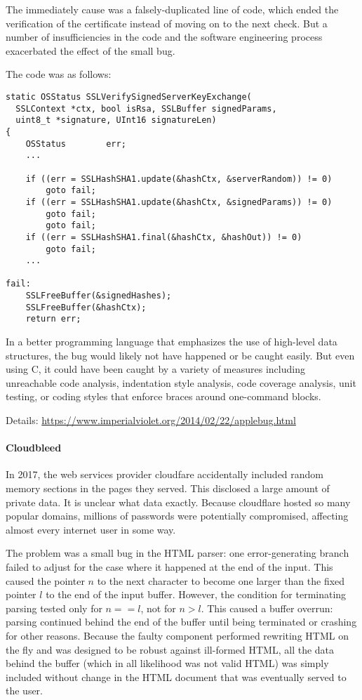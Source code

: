 The immediately cause was a falsely-duplicated line of code, which ended the verification of the certificate instead of moving on to the next check.
But a number of insufficiencies in the code and the software engineering process exacerbated the effect of the small bug.

The code was as follows:

\begin{lstlisting}
static OSStatus SSLVerifySignedServerKeyExchange(
  SSLContext *ctx, bool isRsa, SSLBuffer signedParams,
  uint8_t *signature, UInt16 signatureLen)
{
	OSStatus        err;
	...

	if ((err = SSLHashSHA1.update(&hashCtx, &serverRandom)) != 0)
		goto fail;
	if ((err = SSLHashSHA1.update(&hashCtx, &signedParams)) != 0)
		goto fail;
		goto fail;
	if ((err = SSLHashSHA1.final(&hashCtx, &hashOut)) != 0)
		goto fail;
	...

fail:
	SSLFreeBuffer(&signedHashes);
	SSLFreeBuffer(&hashCtx);
	return err;
\end{lstlisting}

In a better programming language that emphasizes the use of high-level data structures, the bug would likely not have happened or be caught easily.
But even using C, it could have been caught by a variety of measures including unreachable code analysis, indentation style analysis, code coverage analysis, unit testing, or coding styles that enforce braces around one-command blocks.
 
Details: \url{https://www.imperialviolet.org/2014/02/22/applebug.html}

\paragraph{Cloudbleed}
In 2017, the web services provider cloudfare accidentally included random memory sections in the pages they served.
This disclosed a large amount of private data.
It is unclear what data exactly.
Because cloudflare hosted so many popular domains, millions of passwords were potentially compromised, affecting almost every internet user in some way.

The problem was a small bug in the HTML parser: one error-generating branch failed to adjust for the case where it happened at the end of the input.
This caused the pointer $n$ to the next character to become one larger than the fixed pointer $l$ to the end of the input buffer.
However, the condition for terminating parsing tested only for $n==l$, not for $n>l$.
This caused a buffer overrun: parsing continued behind the end of the buffer until being terminated or crashing for other reasons.
Because the faulty component performed rewriting HTML on the fly and was designed to be robust against ill-formed HTML, all the data behind the buffer (which in all likelihood was not valid HTML) was simply included without change in the HTML document that was eventually served to the user.

